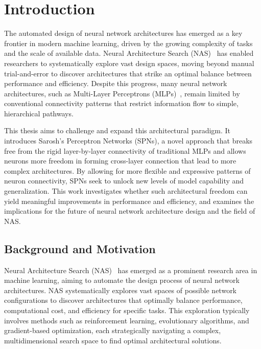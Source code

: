 
\chapter{Introduction} %

\label{Introduction} %


\newcommand{\keyword}[1]{\textbf{#1}}
\newcommand{\tabhead}[1]{\textbf{#1}}
\newcommand{\code}[1]{\texttt{#1}}
\newcommand{\file}[1]{\texttt{\bfseries#1}}
\newcommand{\option}[1]{\texttt{\itshape#1}}


The automated design of neural network architectures has emerged as a key frontier in modern machine learning, driven by the growing complexity of tasks and the scale of available data. Neural Architecture Search (NAS)~\cite{elsken2019neural} has enabled researchers to systematically explore vast design spaces, moving beyond manual trial-and-error to discover architectures that strike an optimal balance between performance and efficiency. Despite this progress, many neural network architectures, such as Multi-Layer Perceptrons (MLPs)~\cite{rumelhart1986learning}, remain limited by conventional connectivity patterns that restrict information flow to simple, hierarchical pathways.

This thesis aims to challenge and expand this architectural paradigm. It introduces Sarosh’s Perceptron Networks (SPNs), a novel approach that breaks free from the rigid layer-by-layer connectivity of traditional MLPs and allows neurons more freedom in forming cross-layer connection that lead to more complex architectures. By allowing for more flexible and expressive patterns of neuron connectivity, SPNs seek to unlock new levels of model capability and generalization. This work investigates whether such architectural freedom can yield meaningful improvements in performance and efficiency, and examines the implications for the future of neural network architecture design and the field of NAS.

\section{Background and Motivation}
Neural Architecture Search (NAS)~\cite{elsken2019neural} has emerged as a prominent research area in machine learning, aiming to automate the design process of neural network architectures. NAS systematically explores vast spaces of possible network configurations to discover architectures that optimally balance performance, computational cost, and efficiency for specific tasks. This exploration typically involves methods such as reinforcement learning, evolutionary algorithms, and gradient-based optimization, each strategically navigating a complex, multidimensional search space to find optimal architectural solutions.

